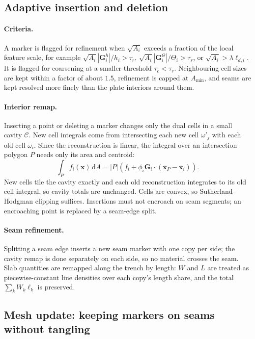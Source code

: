 \documentclass[11pt]{article}
\newcommand{\vect}[1]{\mathbf{#1}}
\newcommand{\dd}{\,\mathrm{d}}
\begin{document}
\subsection{Adaptive insertion and deletion}
\paragraph{Criteria.} A marker is flagged for refinement when $\sqrt{A_i}$ exceeds a fraction of the local feature scale, for example $\sqrt{A_i}|\vect{G}^h_i|/h_i>\tau_r$, $\sqrt{A_i}|\vect{G}^\Theta_i|/\Theta_i>\tau_r$, or $\sqrt{A_i}>\lambda\ell_{d,i}$. It is flagged for coarsening at a smaller threshold $\tau_c<\tau_r$. Neighbouring cell sizes are kept within a factor of about $1.5$, refinement is capped at $A_{\min}$, and seams are kept resolved more finely than the plate interiors around them.

\paragraph{Interior remap.} Inserting a point or deleting a marker changes only the dual cells in a small cavity $\mathcal{C}$. New cell integrals come from intersecting each new cell $\omega'_j$ with each old cell $\omega_i$. Since the reconstruction is linear, the integral over an intersection polygon $P$ needs only its area and centroid:
\begin{equation}
  \int_Pf_i(\vect{x})\dd A=|P|\left(f_i+\phi_i\vect{G}_i\cdot(\bar{\vect{x}}_P-\bar{\vect{x}}_i)\right).
\end{equation}
New cells tile the cavity exactly and each old reconstruction integrates to its old cell integral, so cavity totals are unchanged. Cells are convex, so Sutherland--Hodgman clipping suffices. Insertions must not encroach on seam segments; an encroaching point is replaced by a seam-edge split.

\paragraph{Seam refinement.} Splitting a seam edge inserts a new seam marker with one copy per side; the cavity remap is done separately on each side, so no material crosses the seam. Slab quantities are remapped along the trench by length: $W$ and $L$ are treated as piecewise-constant line densities over each copy's length share, and the total $\sum_kW_k\ell_k$ is preserved.

\subsection{Mesh update: keeping markers on seams without tangling}
\label{sec:meshupdate}
\end{document}
